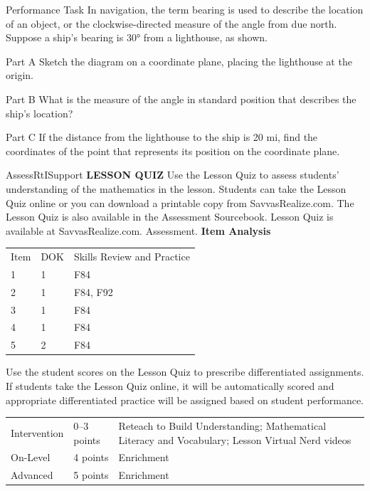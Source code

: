\documentclass{article}
\newenvironment{practice}[2]{}{}        %
\newenvironment{te-addendum}[2]{}{}     %
\newcommand{\answer}[1]{}               %
\newcommand{\placeholder}[2]{}          %
\begin{document}
\begin{practice}{40}{2}
Performance Task In navigation, the term bearing is used to describe the location of an object, or the clockwise-directed measure of the angle from due north. Suppose a ship's bearing is 30° from a lighthouse, as shown.
\placeholder{illustration}{Lighthouse at shore with compass N/E/S/W at base; ship offshore to right. Ray from lighthouse toward north and ray toward ship enclose 30°, clockwise from north.}
Part A Sketch the diagram on a coordinate plane, placing the lighthouse at the origin.
\answer{Part A See graph.}
\placeholder{graph}{Black radius-20 circle centered lighthouse O on compass x/East-West and y/North-South axes with arrows, square grid every 5, labels x=-20,-10,10,20 and y=-20,10,20. Blue vertical segment from O to north intercept and blue radius to ship location in Quadrant I, angle 30° from north.}
Part B What is the measure of the angle in standard position that describes the ship's location?
\answer{60°}
Part C If the distance from the lighthouse to the ship is 20 mi, find the coordinates of the point that represents its position on the coordinate plane.
\answer{The coordinates are (10,10\sqrt3).}
\end{practice}
\begin{te-addendum}{Assess}{RtISupport}
\textbf{LESSON QUIZ}
Use the Lesson Quiz to assess students' understanding of the mathematics in the lesson.
Students can take the Lesson Quiz online or you can download a printable copy from SavvasRealize.com. The Lesson Quiz is also available in the Assessment Sourcebook.
Lesson Quiz is available at SavvasRealize.com. Assessment.
\textbf{Item Analysis}
\begin{tabular}{lll}
Item & DOK & Skills Review and Practice \\
1 & 1 & F84 \\
2 & 1 & F84, F92 \\
3 & 1 & F84 \\
4 & 1 & F84 \\
5 & 2 & F84 \\
\end{tabular}
Use the student scores on the Lesson Quiz to prescribe differentiated assignments.
If students take the Lesson Quiz online, it will be automatically scored and appropriate differentiated practice will be assigned based on student performance.
\begin{tabular}{lll}
Intervention & 0--3 points & Reteach to Build Understanding; Mathematical Literacy and Vocabulary; Lesson Virtual Nerd videos \\
On-Level & 4 points & Enrichment \\
Advanced & 5 points & Enrichment \\
\end{tabular}
\end{te-addendum}
\end{document}
